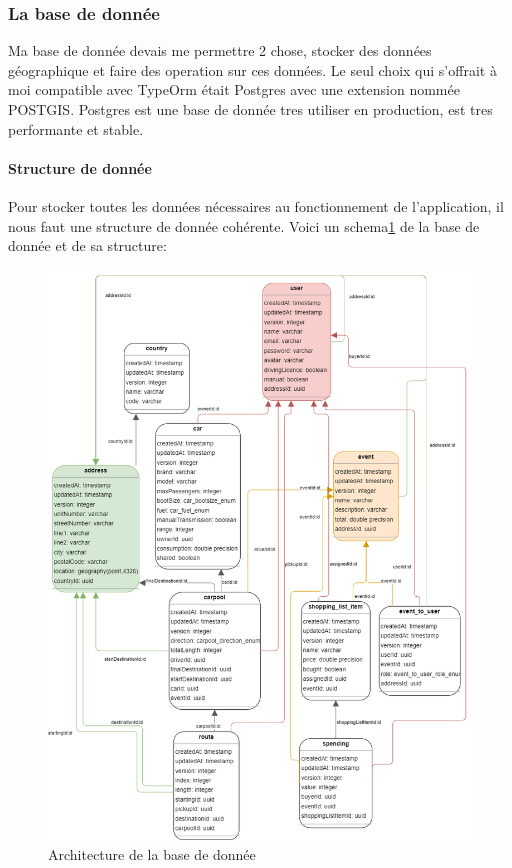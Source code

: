 \subsubsection{La base de donnée}
Ma base de donnée devais me permettre 2 chose, stocker des données géographique et faire des operation sur ces données.
Le seul choix qui s'offrait à moi compatible avec TypeOrm était Postgres avec une extension nommée POSTGIS\@.
Postgres est une base de donnée tres utiliser en production, est tres performante et stable.

\paragraph{Structure de donnée}
Pour stocker toutes les données nécessaires au fonctionnement de l'application, il nous faut une structure de donnée cohérente.
Voici un schema\ref{fig:dbSchema} de la base de donnée et de sa structure:
\begin{figure}[h!]
    \includegraphics[width=\linewidth]{./images/dbShema}\caption{Architecture de la base de donnée}\label{fig:dbSchema}
    \centering
\end{figure}